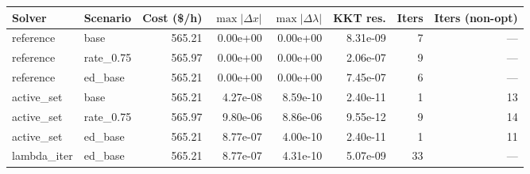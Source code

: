 \begin{tabular}{llrrrrrr}
\toprule
Solver & Scenario & Cost (\$/h) & $\max|\Delta x|$ & $\max|\Delta\lambda|$ & KKT res. & Iters & Iters (non-opt) \\
\midrule
reference & base & 565.21 & 0.00e+00 & 0.00e+00 & 8.31e-09 & 7 & --- \\
reference & rate\_0.75 & 565.97 & 0.00e+00 & 0.00e+00 & 2.06e-07 & 9 & --- \\
reference & ed\_base & 565.21 & 0.00e+00 & 0.00e+00 & 7.45e-07 & 6 & --- \\
active\_set & base & 565.21 & 4.27e-08 & 8.59e-10 & 2.40e-11 & 1 & 13 \\
active\_set & rate\_0.75 & 565.97 & 9.80e-06 & 8.86e-06 & 9.55e-12 & 9 & 14 \\
active\_set & ed\_base & 565.21 & 8.77e-07 & 4.00e-10 & 2.40e-11 & 1 & 11 \\
lambda\_iter & ed\_base & 565.21 & 8.77e-07 & 4.31e-10 & 5.07e-09 & 33 & --- \\
\bottomrule
\end{tabular}
